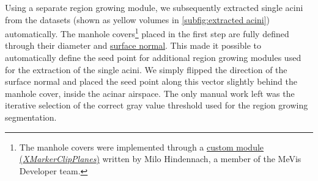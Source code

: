 \documentclass[%
	paper=a4,%
	DIV=calc,%
	twoside=true,%
	abstract=true,%
	]{scrartcl}
\begin{document}
Using a separate region growing module, we subsequently extracted single acini from the datasets (shown as yellow volumes in \autoref{subfig:extracted acini}) automatically. The manhole covers\footnote{The manhole covers were implemented through a \href{http://www.mevis-research.de/cgi-bin/discus/board-auth.cgi?lm=1282233250&file=/839/11760.html}{custom module (\emph{XMarkerClipPlanes})} written by Milo Hindennach, a member of the MeVis Developer team.} placed in the first step are fully defined through their diameter and \href{https://secure.wikimedia.org/wikipedia/en/w/index.php?title=Surface_normal&oldid=411684319}{surface normal}. This made it possible to automatically define the seed point for additional region growing modules used for the extraction of the single acini. We simply flipped the direction of the surface normal and placed the seed point along this vector slightly behind the manhole cover, inside the acinar airspace. The only manual work left was the iterative selection of the correct gray value threshold used for the region growing segmentation.
\end{document}
